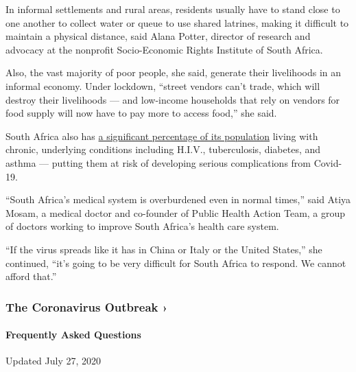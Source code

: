 In informal settlements and rural areas, residents usually have to stand
close to one another to collect water or queue to use shared latrines,
making it difficult to maintain a physical distance, said Alana Potter,
director of research and advocacy at the nonprofit Socio-Economic Rights
Institute of South Africa.

Also, the vast majority of poor people, she said, generate their
livelihoods in an informal economy. Under lockdown, ``street vendors
can't trade, which will destroy their livelihoods --- and low-income
households that rely on vendors for food supply will now have to pay
more to access food,'' she said.

South Africa also has
\href{https://apps.who.int/iris/bitstream/handle/10665/255007/ccs_zaf_2016_2020.pdf?sequence=1}{a
significant percentage of its population} living with chronic,
underlying conditions including H.I.V., tuberculosis, diabetes, and
asthma --- putting them at risk of developing serious complications from
Covid-19.

``South Africa's medical system is overburdened even in normal times,''
said Atiya Mosam, a medical doctor and co-founder of Public Health
Action Team, a group of doctors working to improve South Africa's health
care system.

``If the virus spreads like it has in China or Italy or the United
States,'' she continued, ``it's going to be very difficult for South
Africa to respond. We cannot afford that.''

\href{https://www.nytimes.com/news-event/coronavirus?action=click\&pgtype=Article\&state=default\&region=MAIN_CONTENT_3\&context=storylines_faq}{}

\hypertarget{the-coronavirus-outbreak-}{%
\subsubsection{The Coronavirus Outbreak
›}\label{the-coronavirus-outbreak-}}

\hypertarget{frequently-asked-questions}{%
\paragraph{Frequently Asked
Questions}\label{frequently-asked-questions}}

Updated July 27, 2020

